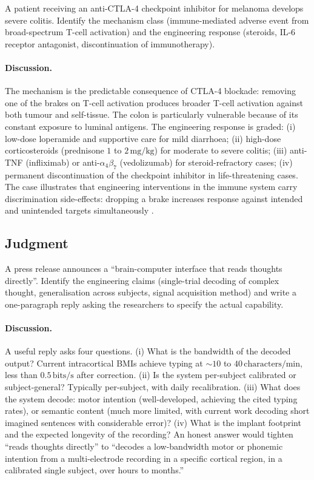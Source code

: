 \begin{exercise}
A patient receiving an anti-CTLA-4 checkpoint inhibitor for melanoma
develops severe colitis. Identify the mechanism class
(immune-mediated adverse event from broad-spectrum T-cell activation)
and the engineering response (steroids, IL-6 receptor antagonist,
discontinuation of immunotherapy).
\end{exercise}

\paragraph{Discussion.}
The mechanism is the predictable consequence of CTLA-4 blockade:
removing one of the brakes on T-cell activation produces broader
T-cell activation against both tumour and self-tissue. The colon is
particularly vulnerable because of its constant exposure to luminal
antigens. The engineering response is graded: (i) low-dose loperamide
and supportive care for mild diarrhoea; (ii) high-dose corticosteroids
(prednisone $1$ to $2\,\text{mg/kg}$) for moderate to severe colitis;
(iii) anti-TNF (infliximab) or anti-$\alpha_4 \beta_7$ (vedolizumab)
for steroid-refractory cases; (iv) permanent discontinuation of the
checkpoint inhibitor in life-threatening cases. The case illustrates
that engineering interventions in the immune system carry
discrimination side-effects: dropping a brake increases response
against intended and unintended targets simultaneously
\cite{paper:v6c07-allison-2018-nobel}.

\subsection*{Judgment}

\begin{exercise}
A press release announces a ``brain-computer interface that reads
thoughts directly''. Identify the engineering claims (single-trial
decoding of complex thought, generalisation across subjects, signal
acquisition method) and write a one-paragraph reply asking the
researchers to specify the actual capability.
\end{exercise}

\paragraph{Discussion.}
A useful reply asks four questions. (i) What is the bandwidth of the
decoded output? Current intracortical BMIs achieve typing at $\sim 10$
to $40\,\text{characters/min}$, less than $0.5\,\text{bits/s}$ after
correction. (ii) Is the system per-subject calibrated or
subject-general? Typically per-subject, with daily recalibration.
(iii) What does the system decode: motor intention (well-developed,
achieving the cited typing rates), or semantic content (much more
limited, with current work decoding short imagined sentences with
considerable error)? (iv) What is the implant footprint and the
expected longevity of the recording? An honest answer would tighten
``reads thoughts directly'' to ``decodes a low-bandwidth motor or
phonemic intention from a multi-electrode recording in a specific
cortical region, in a calibrated single subject, over hours to
months.''

